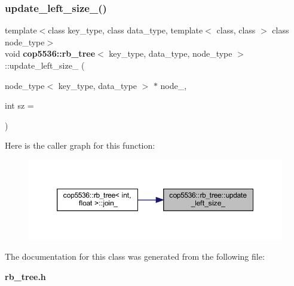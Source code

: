 \subsubsection{update\_left\_size\_()}
{\footnotesize\ttfamily template$<$class key\+\_\+type, class data\+\_\+type, template$<$ class, class $>$ class node\+\_\+type$>$ \\
void \textbf{ cop5536\+::rb\+\_\+tree}$<$ key\+\_\+type, data\+\_\+type, node\+\_\+type $>$\+::update\+\_\+left\+\_\+size\+\_\+ (\begin{DoxyParamCaption}\item[{node\+\_\+type$<$ key\+\_\+type, data\+\_\+type $>$ $\ast$}]{node\+\_\+,  }\item[{int}]{sz = {} }\end{DoxyParamCaption})\hspace{0.3cm}{\ttfamily [inline]}}

Here is the caller graph for this function\+:
\nopagebreak
\begin{figure}[H]
\begin{center}
\leavevmode
\includegraphics[width=350pt]{classcop5536_1_1rb__tree_ab1d05dae701473136ce4db4592c1659d_icgraph}
\end{center}
\end{figure}


The documentation for this class was generated from the following file\+:\begin{DoxyCompactItemize}
\item 
\textbf{ rb\+\_\+tree.\+h}\end{DoxyCompactItemize}
